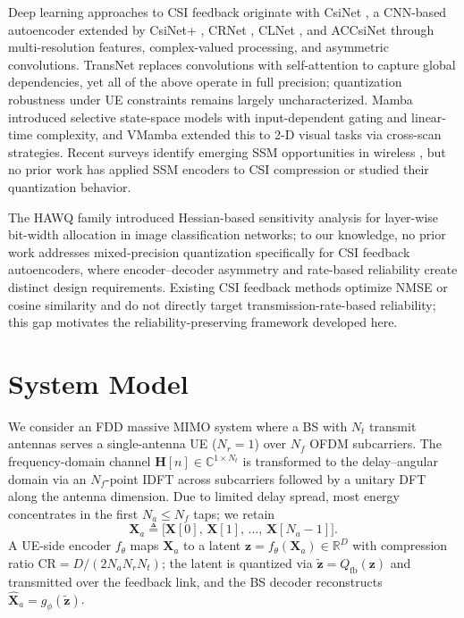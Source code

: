 \documentclass[conference]{IEEEtran}
\begin{document}
Deep learning approaches to CSI feedback originate with CsiNet \cite{CsiNet}, a CNN-based autoencoder extended by CsiNet+ \cite{CsiNetPlus}, CRNet \cite{CRNet}, CLNet \cite{CLNet}, and ACCsiNet \cite{ACCsiNet} through multi-resolution features, complex-valued processing, and asymmetric convolutions.
TransNet \cite{TransNet} replaces convolutions with self-attention to capture global dependencies, yet all of the above operate in full precision; quantization robustness under UE constraints remains largely uncharacterized.
Mamba \cite{Mamba} introduced selective state-space models with input-dependent gating and linear-time complexity, and VMamba \cite{VMamba} extended this to 2-D visual tasks via cross-scan strategies.
Recent surveys identify emerging SSM opportunities in wireless \cite{MambaWireless}, but no prior work has applied SSM encoders to CSI compression or studied their quantization behavior.

The HAWQ family \cite{HAWQ,HAWQV2,HAWQV3} introduced Hessian-based sensitivity analysis for layer-wise bit-width allocation in image classification networks; to our knowledge, no prior work addresses mixed-precision quantization specifically for CSI feedback autoencoders, where encoder--decoder asymmetry and rate-based reliability create distinct design requirements.
Existing CSI feedback methods optimize NMSE or cosine similarity and do not directly target transmission-rate-based reliability; this gap motivates the reliability-preserving framework developed here.

\section{System Model}
\label{sec:system_model}

We consider an FDD massive MIMO system where a BS with $N_t$ transmit antennas serves a single-antenna UE ($N_r=1$) over $N_f$ OFDM subcarriers.
The frequency-domain channel $\mathbf{H}[n]\in\mathbb{C}^{1\times N_t}$ is transformed to the delay--angular domain via an $N_f$-point IDFT across subcarriers followed by a unitary DFT along the antenna dimension.
Due to limited delay spread, most energy concentrates in the first $N_a\le N_f$ taps; we retain
\begin{equation}
\mathbf{X}_a \triangleq \big[\mathbf{X}[0],\,\mathbf{X}[1],\,\ldots,\,\mathbf{X}[N_a-1]\big].
\label{eq:truncate}
\end{equation}
A UE-side encoder $f_\theta$ maps $\mathbf{X}_a$ to a latent $\mathbf{z}=f_\theta(\mathbf{X}_a)\in\mathbb{R}^D$ with compression ratio $\mathrm{CR}=D/(2N_aN_rN_t)$; the latent is quantized via $\tilde{\mathbf{z}}=Q_{\mathrm{fb}}(\mathbf{z})$ and transmitted over the feedback link, and the BS decoder reconstructs $\hat{\mathbf{X}}_a=g_\phi(\tilde{\mathbf{z}})$.
\end{document}
